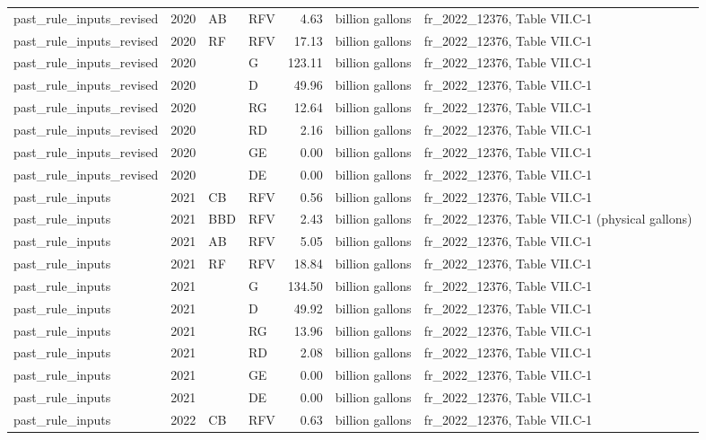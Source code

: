 \begin{longtable}{p{2.3cm}p{0.7cm}p{1.0cm}p{2.6cm}rp{1.7cm}p{4.6cm}}
past\_rule\_inputs\_revised & 2020 & AB & RFV & 4.63 & billion gallons & fr\_2022\_12376, Table VII.C-1 \\
past\_rule\_inputs\_revised & 2020 & RF & RFV & 17.13 & billion gallons & fr\_2022\_12376, Table VII.C-1 \\
past\_rule\_inputs\_revised & 2020 &  & G & 123.11 & billion gallons & fr\_2022\_12376, Table VII.C-1 \\
past\_rule\_inputs\_revised & 2020 &  & D & 49.96 & billion gallons & fr\_2022\_12376, Table VII.C-1 \\
past\_rule\_inputs\_revised & 2020 &  & RG & 12.64 & billion gallons & fr\_2022\_12376, Table VII.C-1 \\
past\_rule\_inputs\_revised & 2020 &  & RD & 2.16 & billion gallons & fr\_2022\_12376, Table VII.C-1 \\
past\_rule\_inputs\_revised & 2020 &  & GE & 0.00 & billion gallons & fr\_2022\_12376, Table VII.C-1 \\
past\_rule\_inputs\_revised & 2020 &  & DE & 0.00 & billion gallons & fr\_2022\_12376, Table VII.C-1 \\
past\_rule\_inputs & 2021 & CB & RFV & 0.56 & billion gallons & fr\_2022\_12376, Table VII.C-1 \\
past\_rule\_inputs & 2021 & BBD & RFV & 2.43 & billion gallons & fr\_2022\_12376, Table VII.C-1 (physical gallons) \\
past\_rule\_inputs & 2021 & AB & RFV & 5.05 & billion gallons & fr\_2022\_12376, Table VII.C-1 \\
past\_rule\_inputs & 2021 & RF & RFV & 18.84 & billion gallons & fr\_2022\_12376, Table VII.C-1 \\
past\_rule\_inputs & 2021 &  & G & 134.50 & billion gallons & fr\_2022\_12376, Table VII.C-1 \\
past\_rule\_inputs & 2021 &  & D & 49.92 & billion gallons & fr\_2022\_12376, Table VII.C-1 \\
past\_rule\_inputs & 2021 &  & RG & 13.96 & billion gallons & fr\_2022\_12376, Table VII.C-1 \\
past\_rule\_inputs & 2021 &  & RD & 2.08 & billion gallons & fr\_2022\_12376, Table VII.C-1 \\
past\_rule\_inputs & 2021 &  & GE & 0.00 & billion gallons & fr\_2022\_12376, Table VII.C-1 \\
past\_rule\_inputs & 2021 &  & DE & 0.00 & billion gallons & fr\_2022\_12376, Table VII.C-1 \\
past\_rule\_inputs & 2022 & CB & RFV & 0.63 & billion gallons & fr\_2022\_12376, Table VII.C-1 \\

\end{longtable}
